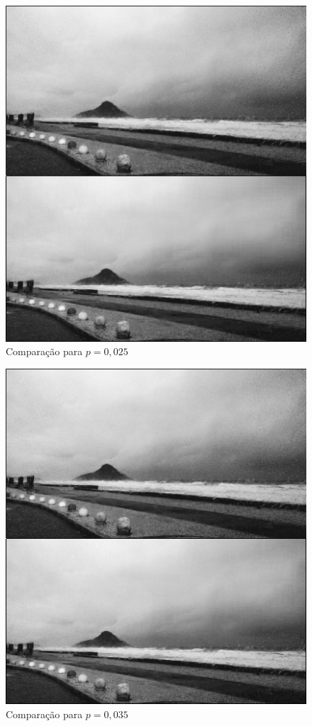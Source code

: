 \documentclass[11pt]{article}
\begin{document}
\begin{enumerate}
            \begin{figure}[]
                \centering
                \includegraphics[]{2-2-025}
                \caption{Comparação para $p = 0,025$}
            \end{figure}
            
            \begin{figure}[H]
                \centering
                \includegraphics[]{2-2-035}
                \caption{Comparação para $p = 0,035$}
            \end{figure}
            

\end{enumerate}
\end{document}
